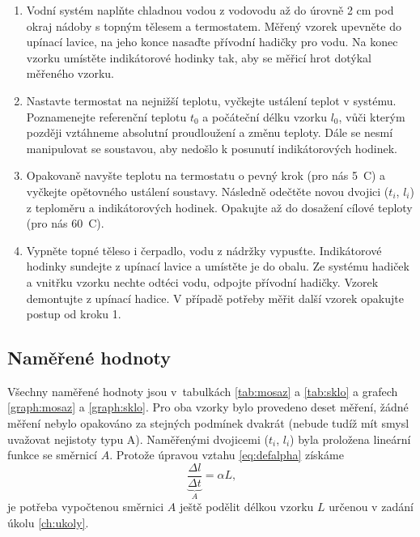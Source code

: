 \documentclass[a4paper,12pt]{article}   %
\begin{document}
\begin{enumerate}
  \item Vodní systém naplňte chladnou vodou z vodovodu až do úrovně 2 cm pod okraj nádoby s topným tělesem a termostatem. Měřený vzorek upevněte do upínací lavice, na jeho konce nasaďte přívodní hadičky pro vodu. Na konec vzorku umístěte indikátorové hodinky tak, aby se měřicí hrot dotýkal měřeného vzorku.
  \item Nastavte termostat na nejnižší teplotu, vyčkejte ustálení teplot v systému. Poznamenejte referenční teplotu $t_0$ a počáteční délku vzorku $l_0$, vůči kterým později vztáhneme absolutní proudloužení a změnu teploty. Dále se nesmí manipulovat se soustavou, aby nedošlo k posunutí indikátorových hodinek.
  \item Opakovaně navyšte teplotu na termostatu o pevný krok (pro nás 5~\degree C) a vyčkejte opětovného ustálení soustavy. Následně odečtěte novou dvojici ($t_i$, $l_i$) z teploměru a indikátorových hodinek. Opakujte až do dosažení cílové teploty (pro nás 60~\degree C).
  \item Vypněte topné těleso i čerpadlo, vodu z nádržky vypusťte. Indikátorové hodinky sundejte z upínací lavice a umístěte je do obalu. Ze systému hadiček a vnitřku vzorku nechte odtéci vodu, odpojte přívodní hadičky. Vzorek demontujte z upínací hadice. V případě potřeby měřit další vzorek opakujte postup od kroku 1.
\end{enumerate}

\subsection{Naměřené hodnoty}
Všechny naměřené hodnoty jsou v~tabulkách \ref{tab:mosaz} a \ref{tab:sklo} a grafech \ref{graph:mosaz} a \ref{graph:sklo}. Pro oba vzorky bylo provedeno deset měření, žádné měření nebylo opakováno za stejných podmínek dvakrát (nebude tudíž mít smysl uvažovat nejistoty typu A). Naměřenými dvojicemi ($t_i$, $l_i$) byla proložena lineární funkce se směrnicí $A$. Protože úpravou vztahu \eqref{eq:defalpha} získáme
\begin{equation}
  \underbrace{\frac{\Delta l}{\Delta t}}_{A} = \alpha L\text{,}
\end{equation}
je potřeba vypočtenou směrnici $A$ ještě podělit délkou vzorku $L$ určenou v zadání úkolu \ref{ch:ukoly}.
\end{document}
